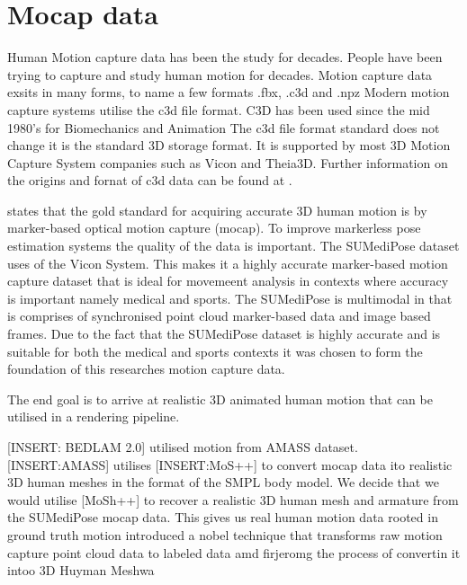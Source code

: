 \renewcommand{\labelenumii}{\arabic{enumi}.\arabic{enumii}}
\renewcommand{\labelenumiii}{\arabic{enumi}.\arabic{enumii}.\arabic{enumiii}}
\renewcommand{\labelenumiv}{\arabic{enumi}.\arabic{enumii}.\arabic{enumiii}.\arabic{enumiv}}

\label{chap:methodologyandproposedresearchplan}

\label{sec:methodology}

\section{Mocap data}

Human Motion capture data has been the study for decades. People have been trying to capture and study human motion for decades.
Motion capture data exsits in many forms, to name a few formats .fbx, .c3d and .npz
Modern motion capture systems utilise the c3d file format. C3D has been used since the mid 1980's for Biomechanics and Animation
The c3d file format standard does not change it is the standard 3D storage format. It is supported by most 3D Motion Capture System companies such as Vicon and Theia3D.
Further information on the origins and fornat of c3d data can be found at \cite{cramp2023standard}.

\citet{ghorbani2021soma} states that the gold standard for acquiring accurate 3D human motion is by marker-based optical motion capture (mocap). 
To improve markerless pose estimation systems the quality of the data is important. The SUMediPose dataset uses of the Vicon System. This makes it a highly accurate marker-based motion capture dataset that is ideal for movemeent analysis in contexts where accuracy is important namely medical and sports. \cite{schreuder2025sumedipose}
The SUMediPose is multimodal in that is comprises of synchronised point cloud marker-based data and image based frames.  
Due to the fact that the SUMediPose dataset is highly accurate and is suitable for both the medical and sports contexts it was chosen to form the foundation of this researches motion capture data. 

The end goal is to arrive at realistic 3D animated human motion that can be utilised in a rendering pipeline.

[INSERT: BEDLAM 2.0] utilised motion from AMASS dataset. [INSERT:AMASS] utilises [INSERT:MoS++] to convert mocap data ito realistic 3D human meshes in the format of the SMPL body model. 
We decide that we would utilise [MoSh++] to recover a realistic 3D human mesh and armature from the SUMediPose mocap data. This gives us real human motion data rooted in ground truth motion 
\citet{ghorbani2021soma} introduced a nobel technique that transforms raw motion capture point cloud data to labeled data amd firjeromg the process of convertin it intoo 3D Huyman Meshwa

